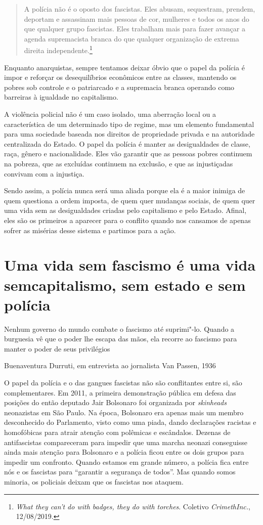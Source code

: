 \begin{quote}
A polícia não é o oposto dos fascistas. Eles abusam, sequestram, prendem, deportam e assassinam mais pessoas de cor, mulheres e  todos os anos do que qualquer grupo fascistas. Eles trabalham mais para fazer avançar a agenda supremacista branca do que qualquer organização de extrema direita independente.\footnote{\emph{What they can't do with badges, they do with torches}. Coletivo \emph{CrimethInc.}, 12/08/2019.}
\end{quote}

Enquanto anarquistas, sempre tentamos deixar óbvio que o papel da polícia é impor e reforçar os desequilíbrios econômicos entre as classes, mantendo os pobres sob controle e o patriarcado e a supremacia branca operando como barreiras à igualdade no capitalismo.

A violência policial não é um caso isolado, uma aberração local ou a característica de um determinado tipo de regime, mas um elemento fundamental para uma sociedade baseada nos direitos de propriedade privada e na autoridade centralizada do Estado. O papel da polícia é manter as desigualdades de classe, raça, gênero e nacionalidade. Eles vão garantir que as pessoas pobres continuem na pobreza, que as excluídas continuem na exclusão, e que as injustiçadas convivam com a injustiça.

Sendo assim, a polícia nunca será uma aliada porque ela é a maior inimiga de quem questiona a ordem imposta, de quem quer mudanças sociais, de quem quer uma vida sem as desigualdades criadas pelo capitalismo e pelo Estado. Afinal, eles são os primeiros a aparecer para o conflito quando nos cansamos de apenas sofrer as misérias desse sistema e partimos para a ação.

\section{Uma vida sem fascismo é uma vida sem\break capitalismo, sem estado e sem polícia}

\epigraph{Nenhum governo do mundo combate o fascismo até suprimi"-lo. Quando a burguesia vê que o poder lhe escapa das mãos, ela recorre ao fascismo para manter o poder de seus privilégios}{Buenaventura Durruti, em entrevista ao jornalista Van Passen, 1936}

O papel da polícia e o das gangues fascistas não são conflitantes entre si, são complementares. Em 2011, a primeira demonstração pública em defesa das posições do então deputado Jair Bolsonaro foi organizada por \emph{skinheads} neonazistas em São Paulo. Na época, Bolsonaro era apenas mais um membro desconhecido do Parlamento, visto como uma piada, dando declarações racistas e homofóbicas para atrair atenção com polêmicas e escândalos. Dezenas de antifascistas compareceram para impedir que uma marcha neonazi conseguisse ainda mais atenção para Bolsonaro e a polícia ficou entre os dois grupos para impedir um confronto. Quando estamos em grande número, a polícia fica entre nós e os fascistas para ``garantir a segurança de todos''. Mas quando somos minoria, os policiais deixam que os fascistas nos ataquem.

